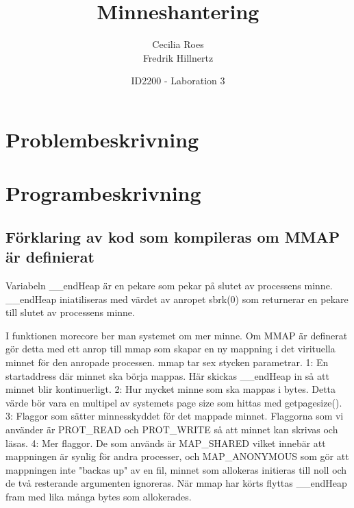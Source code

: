 \documentclass[a4paper]{article}
\title{Minneshantering}
\date{ID2200 - Laboration 3}
\author{Cecilia Roes \\ Fredrik Hillnertz}
\begin{document}

\maketitle

\section*{Problembeskrivning}


\section*{Programbeskrivning}

\subsection*{Förklaring av kod som kompileras om MMAP är definierat}


Variabeln __endHeap är en pekare som pekar på slutet av processens minne. __endHeap iniatiliseras med värdet av anropet sbrk(0) som returnerar en pekare till slutet av processens minne.

%


I funktionen morecore ber man systemet om mer minne. Om MMAP är definerat gör detta med ett anrop till mmap som skapar en ny mappning i det virituella minnet för den anropade processen. mmap tar sex stycken parametrar. 1: En startaddress där minnet ska börja mappas. Här skickas __endHeap in så att minnet blir kontinuerligt. 2: Hur mycket minne som ska mappas i bytes. Detta värde bör vara en multipel av systemets page size som hittas med getpagesize(). 3: Flaggor som sätter minnesskyddet för det mappade minnet. Flaggorna som vi använder är PROT_READ och PROT_WRITE så att minnet kan skrivas och läsas. 4: Mer flaggor. De som används är MAP_SHARED vilket innebär att mappningen är synlig för andra processer, och MAP_ANONYMOUS som gör att mappningen inte "backas up" av en fil, minnet som allokeras initieras till noll och de två resterande argumenten ignoreras. När mmap har körts flyttas __endHeap fram med lika många bytes som allokerades.
\end{document}
